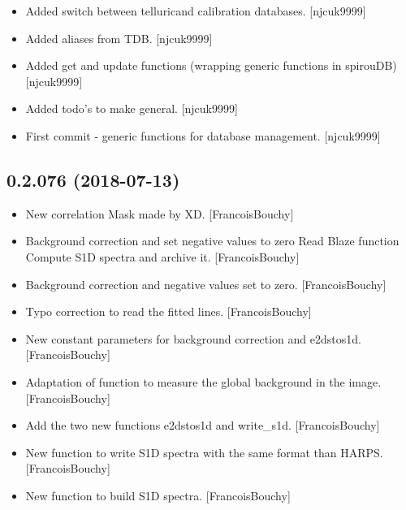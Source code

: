 \documentclass[a4paper,10pt,english]{report}
\begin{document}
\begin{itemize}
\item {} 
Added switch between telluricand calibration databases. {[}njcuk9999{]}

\item {} 
Added aliases from TDB. {[}njcuk9999{]}

\item {} 
Added get and update functions (wrapping generic functions in
spirouDB) {[}njcuk9999{]}

\item {} 
Added todo’s to make general. {[}njcuk9999{]}

\item {} 
First commit - generic functions for database management. {[}njcuk9999{]}

\end{itemize}


\subsection{0.2.076 (2018-07-13)}
\label{\detokenize{misc/changelog:id393}}\begin{itemize}
\item {} 
New correlation Mask made by XD. {[}FrancoisBouchy{]}

\item {} 
Background correction and set negative values to zero Read Blaze
function Compute S1D spectra and archive it. {[}FrancoisBouchy{]}

\item {} 
Background correction and negative values set to zero.
{[}FrancoisBouchy{]}

\item {} 
Typo correction to read the fitted lines. {[}FrancoisBouchy{]}

\item {} 
New constant parameters for background correction and e2dstos1d.
{[}FrancoisBouchy{]}

\item {} 
Adaptation of function to measure the global background in the image.
{[}FrancoisBouchy{]}

\item {} 
Add the two new functions e2dstos1d and write\_s1d. {[}FrancoisBouchy{]}

\item {} 
New function to write S1D spectra with the same format than HARPS.
{[}FrancoisBouchy{]}

\item {} 
New function to build S1D spectra. {[}FrancoisBouchy{]}

\end{itemize}
\end{document}
